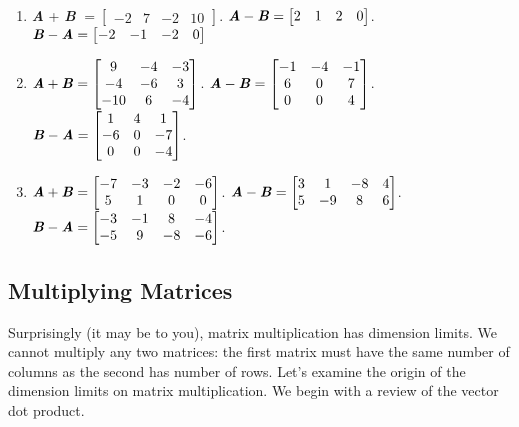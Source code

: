 \begin{Answer}[ref = add_mat]
\begin{enumerate}
\item \textbf{\textit{A}} + \textbf{\textit{B}} $= \begin{bmatrix}
-2 & 7 & -2 & 10
\end{bmatrix}$. $\textbf{\textit{A}} - \textbf{\textit{B}} = \begin{bmatrix}
2 & 1 & 2 & 0
\end{bmatrix}$. $\textbf{\textit{B}} - \textbf{\textit{A}} = \begin{bmatrix}
-2 & -1 & -2 & 0
\end{bmatrix}$
\item $\textbf{\textit{A}} + \textbf{\textit{B}} = \begin{bmatrix}
9 & -4 & -3\\
-4 & -6 & 3\\
-10 & 6 & -4
\end{bmatrix}$. $\textbf{\textit{A}} - \textbf{\textit{B}} = \begin{bmatrix}
-1 & -4 & -1\\
6 & 0 & 7\\
0 & 0 & 4
\end{bmatrix}$. $\textbf{\textit{B}} - \textbf{\textit{A}} = \begin{bmatrix}
1 & 4 & 1\\
-6 & 0 & -7\\
0 & 0 & -4
\end{bmatrix}$.
\item $\textbf{\textit{A}} + \textbf{\textit{B}} = \begin{bmatrix}
-7 & -3 & -2 & -6\\
5 & 1 & 0 & 0
\end{bmatrix}$. $\textbf{\textit{A}} - \textbf{\textit{B}} = \begin{bmatrix}
3 & 1 & -8 & 4\\
5 & -9 & 8 & 6
\end{bmatrix}$. $\textbf{\textit{B}} - \textbf{\textit{A}} = \begin{bmatrix}
-3 & -1 & 8 & -4\\
-5 & 9 & -8 & -6
\end{bmatrix}$.
\end{enumerate}
\end{Answer}

\subsection{Multiplying Matrices}
Surprisingly (it may be to you), matrix multiplication has dimension limits. 
We cannot multiply any two matrices: the first matrix must have the same 
number of columns as the second has number of rows. Let's examine the origin 
of the dimension limits on matrix multiplication. We begin with a review of 
the vector dot product. 

